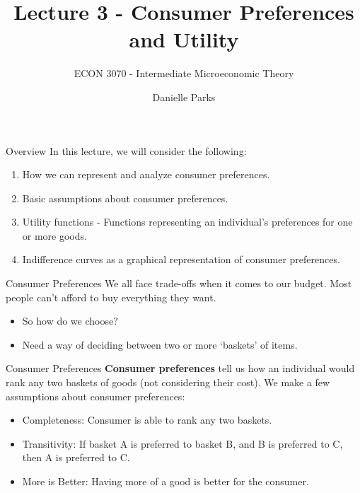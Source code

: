 \documentclass{beamer}
\author{Danielle Parks}
\title{Lecture 3 - Consumer Preferences and Utility}
\subtitle{ECON 3070 - Intermediate Microeconomic Theory}
\begin{document}
\begin{frame}
  \titlepage
\end{frame}

\begin{frame}{Overview}
  In this lecture, we will consider the following:
  \begin{enumerate}
    \item How we can represent and analyze consumer preferences.
    \item Basic assumptions about consumer preferences.
    \item Utility functions  - Functions representing an individual's preferences for one or more goods.
    \item Indifference curves as a graphical representation of consumer preferences.
  \end{enumerate}
\end{frame}


\begin{frame}{Consumer Preferences}
  We all face trade-offs when it comes to our budget. Most people can't afford to buy everything they want.

  \begin{itemize}
    \item So how do we choose?

    \item Need a way of deciding between two or more `baskets' of items.
  \end{itemize}
\end{frame}

\begin{frame}{Consumer Preferences}
  \textbf{Consumer preferences} tell us how an individual would rank any two baskets of goods (not considering their cost). We make a few assumptions about consumer preferences:

  \bigskip
  \begin{itemize}
    \item Completeness: Consumer is able to rank any two baskets.
    \item Transitivity: If basket A is preferred to basket B, and B is preferred to C, then A is preferred to C.
    \item More is Better: Having more of a good is better for the consumer.
  \end{itemize}
\end{frame}
\end{document}
